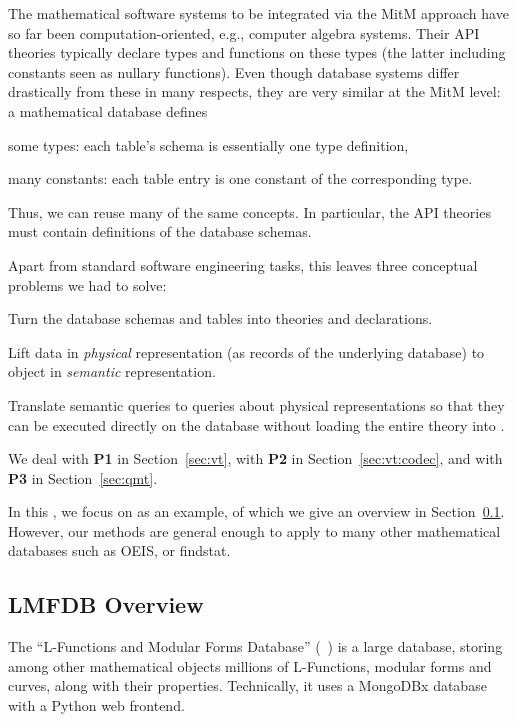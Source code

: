 The mathematical software systems to be integrated via the MitM approach have so far been computation-oriented, e.g., computer algebra systems.
Their API theories typically declare types and functions on these types (the latter including constants seen as nullary functions).
Even though database systems differ drastically from these in many respects, they are very similar at the MitM level: a mathematical database defines
\begin{compactitem}
 \item some types: each table's schema is essentially one type definition,
 \item many constants: each table entry is one constant of the corresponding type.
\end{compactitem}
Thus, we can reuse many of the same concepts.
In particular, the API theories must contain definitions of the database schemas. 

Apart from standard software engineering tasks, this leaves three conceptual problems we had to solve:
\begin{compactenum}[\bf P1]
\item Turn the database schemas and tables into \ommt theories and declarations. 
\item Lift data in \emph{physical} representation (as records of the
  underlying database) to \ommt object in \emph{semantic} representation.
\item Translate semantic queries to queries about physical representations so
  that they can be executed directly on the database without loading the entire theory into
  \mmt.
\end{compactenum}
We deal with \textbf{P1} in Section~\ref{sec:vt}, with \textbf{P2} in Section~\ref{sec:vt:codec}, and with \textbf{P3} in Section~\ref{sec:qmt}. 

In this \papertype, we focus on \lmfdb as an example, of which we give an overview in Section~\ref{sec:lmfdb}.
However, our methods are general enough to apply to many other mathematical databases such as OEIS, or findstat.

 \subsection{LMFDB Overview}\label{sec:lmfdb}

 The ``L-Functions and Modular Forms Database'' (\lmfdb~\cite{lmfdb}) is a large database, storing among other mathematical objects millions of L-Functions, modular forms and curves, along with their properties.
Technically, it uses a MongoDBx database with a Python web frontend.

